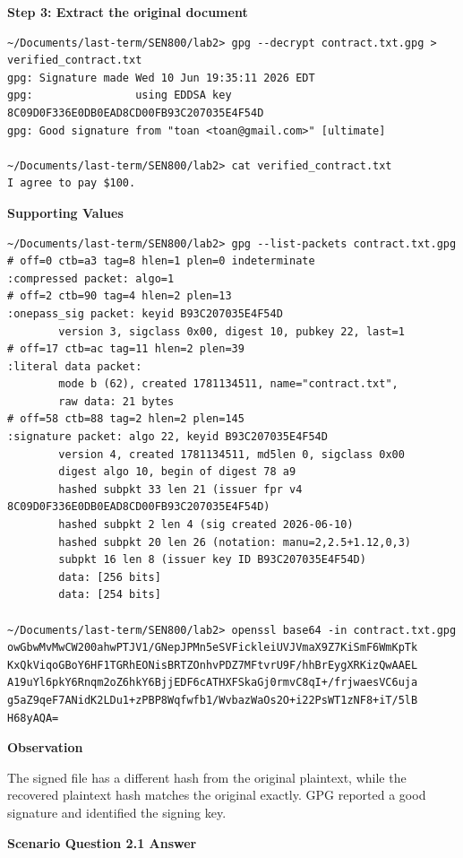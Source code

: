\documentclass[12pt]{article}
\begin{document}
\textbf{Step 3: Extract the original document}

\begin{lstlisting}[style=terminal]
~/Documents/last-term/SEN800/lab2> gpg --decrypt contract.txt.gpg > verified_contract.txt
gpg: Signature made Wed 10 Jun 19:35:11 2026 EDT
gpg:                using EDDSA key 8C09D0F336E0DB0EAD8CD00FB93C207035E4F54D
gpg: Good signature from "toan <toan@gmail.com>" [ultimate]

~/Documents/last-term/SEN800/lab2> cat verified_contract.txt
I agree to pay $100.
\end{lstlisting}

\textbf{Supporting Values}

\begin{lstlisting}[style=terminal]
~/Documents/last-term/SEN800/lab2> gpg --list-packets contract.txt.gpg
# off=0 ctb=a3 tag=8 hlen=1 plen=0 indeterminate
:compressed packet: algo=1
# off=2 ctb=90 tag=4 hlen=2 plen=13
:onepass_sig packet: keyid B93C207035E4F54D
        version 3, sigclass 0x00, digest 10, pubkey 22, last=1
# off=17 ctb=ac tag=11 hlen=2 plen=39
:literal data packet:
        mode b (62), created 1781134511, name="contract.txt",
        raw data: 21 bytes
# off=58 ctb=88 tag=2 hlen=2 plen=145
:signature packet: algo 22, keyid B93C207035E4F54D
        version 4, created 1781134511, md5len 0, sigclass 0x00
        digest algo 10, begin of digest 78 a9
        hashed subpkt 33 len 21 (issuer fpr v4 8C09D0F336E0DB0EAD8CD00FB93C207035E4F54D)
        hashed subpkt 2 len 4 (sig created 2026-06-10)
        hashed subpkt 20 len 26 (notation: manu=2,2.5+1.12,0,3)
        subpkt 16 len 8 (issuer key ID B93C207035E4F54D)
        data: [256 bits]
        data: [254 bits]

~/Documents/last-term/SEN800/lab2> openssl base64 -in contract.txt.gpg
owGbwMvMwCW200ahwPTJV1/GNepJPMn5eSVFickleiUVJVmaX9Z7KiSmF6WmKpTk
KxQkViqoGBoY6HF1TGRhEONisBRTZOnhvPDZ7MFtvrU9F/hhBrEygXRKizQwAAEL
A19uYl6pkY6Rnqm2oZ6hkY6BjjEDF6cATHXFSkaGj0rmvC8qI+/frjwaesVC6uja
g5aZ9qeF7ANidK2LDu1+zPBP8Wqfwfb1/WvbazWaOs2O+i22PsWT1zNF8+iT/5lB
H68yAQA=
\end{lstlisting}

\textbf{Observation}

The signed file has a different hash from the original plaintext, while the recovered plaintext hash matches the original exactly. GPG reported a good signature and identified the signing key.

\textbf{Scenario Question 2.1 Answer}
\end{document}
